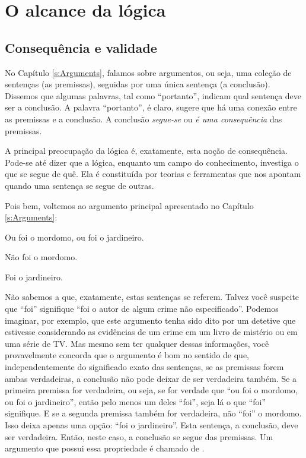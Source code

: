 \chapter{O alcance da lógica}
\label{s:Valid}

\section{Consequência e validade}

No Capítulo \ref{s:Arguments}, falamos sobre argumentos, ou seja, uma coleção de sentenças (as premissas), seguidas por uma única sentença (a conclusão).
Dissemos que algumas palavras, tal como ``portanto'', indicam qual sentença deve ser a conclusão.
A palavra ``portanto'', é claro, sugere que há uma conexão entre as premissas e a conclusão.
A conclusão \emph{segue-se} ou \emph{é uma consequência} das premissas.

A principal preocupação da lógica é, exatamente, esta noção de consequência.
Pode-se até dizer que a lógica, enquanto um campo do conhecimento, investiga o que se segue de quê.
Ela é constituída por teorias e ferramentas que nos apontam quando uma sentença se segue de outras.

Pois bem, voltemos ao argumento principal apresentado no Capítulo \ref{s:Arguments}: 
	\begin{earg}
		\item[] Ou foi o mordomo, ou foi o jardineiro.
		\item[] Não foi o mordomo.
		\item[\therefore] Foi o jardineiro.
	\end{earg}
Não sabemos a que, exatamente, estas sentenças se referem.
Talvez você suspeite que ``foi'' signifique ``foi o autor de algum crime não especificado''.
Podemos imaginar, por exemplo, que este argumento tenha sido dito por um detetive que estivesse considerando as evidências de um crime em um livro de mistério ou em uma série de TV.
Mas mesmo sem ter qualquer dessas informações, você provavelmente concorda que o argumento é bom no sentido de que, independentemente do significado exato das sentenças, se as premissas forem ambas verdadeiras, a conclusão não pode deixar de ser verdadeira também.
Se a primeira premissa for verdadeira, ou seja, se for verdade que ``ou foi o mordomo, ou foi o jardineiro'', então pelo menos um deles ``foi'', seja lá o que ``foi'' signifique.
E se a segunda premissa também for verdadeira, não ``foi'' o mordomo.
Isso deixa apenas uma opção: ``foi o jardineiro''. Esta sentença, a conclusão, deve ser verdadeira.
Então, neste caso, a conclusão se segue das premissas.
Um argumento que possui essa propriedade é chamado de .

